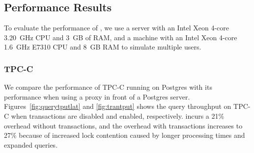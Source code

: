 \subsection{Performance Results}

To evaluate the performance of \name, we use a server with an Intel
Xeon 4-core 3.20~GHz CPU and 3~GB of RAM, and a machine with
an Intel Xeon 4-core 1.6~GHz E7310 CPU and 8~GB RAM to
simulate multiple users.

\subsubsection{TPC-C}



We compare the performance of TPC-C running on Postgres with its
performance when using a \name proxy in front of a Postgres server.
Figures~\ref{fig:querytputlat} and \ref{fig:trantput} shows the
query throughput on TPC-C when transactions are disabled and enabled,
respectively.  \name incurs a 21\% overhead without transactions, and
the overhead with transactions increases to 27\% because of
increased lock contention caused by longer processing times and
expanded queries.



